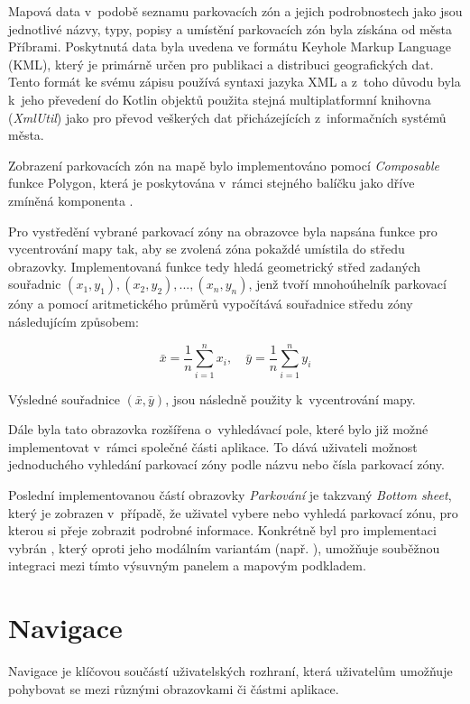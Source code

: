 Mapová data v~podobě seznamu parkovacích zón a jejich podrobnostech jako jsou jednotlivé názvy, typy, popisy a umístění parkovacích zón byla 
získána od města Příbrami. Poskytnutá data byla uvedena ve formátu Keyhole Markup Language (KML), který je primárně určen pro publikaci a 
distribuci geografických dat. Tento formát ke svému zápisu používá syntaxi jazyka XML a z~toho důvodu byla k~jeho převedení do Kotlin objektů 
použita stejná multiplatformní knihovna (\textit{XmlUtil}) jako pro převod veškerých dat přicházejících z~informačních systémů města.

Zobrazení parkovacích zón na mapě bylo implementováno pomocí \textit{Composable} funkce Polygon, která je poskytována v~rámci stejného balíčku 
jako dříve zmíněná komponenta .

Pro vystředění vybrané parkovací zóny na obrazovce byla napsána funkce pro vycentrování mapy tak, aby se zvolená zóna pokaždé 
umístila do středu obrazovky. Implementovaná funkce tedy hledá geometrický střed zadaných souřadnic \( (x_1, y_1), (x_2, y_2), ..., (x_n, y_n)\), 
jenž tvoří mnohoúhelník parkovací zóny a pomocí aritmetického průměrů vypočítává souřadnice středu zóny následujícím způsobem:

\[
\bar{x} = \frac{1}{n} \sum_{i=1}^{n} x_i, \quad \bar{y} = \frac{1}{n} \sum_{i=1}^{n} y_i
\]

Výsledné souřadnice $(\bar{x},\bar{y})$, jsou následně použity k~vycentrování mapy.

\bigskip

Dále byla tato obrazovka rozšířena o~vyhledávací pole, které bylo již možné implementovat v~rámci společné části aplikace. 
To dává uživateli možnost jednoduchého vyhledání parkovací zóny podle názvu nebo čísla parkovací zóny.

Poslední implementovanou částí obrazovky \textit{Parkování} je takzvaný \textit{Bottom sheet}, který je zobrazen v~případě, 
že uživatel vybere nebo vyhledá parkovací zónu, pro kterou si přeje zobrazit podrobné informace. Konkrétně byl pro implementaci vybrán 
, který oproti jeho modálním variantám (např. ), umožňuje souběžnou integraci mezi tímto
 výsuvným panelem a mapovým podkladem.


\section{Navigace}
Navigace je klíčovou součástí uživatelských rozhraní, která uživatelům umožňuje pohybovat se mezi různými obrazovkami či 
částmi aplikace. 


